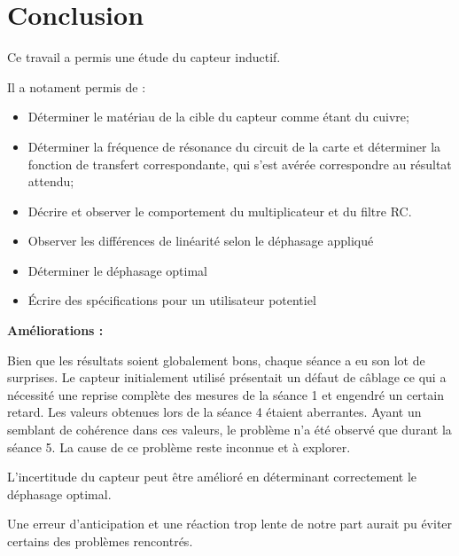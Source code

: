 \newpage
\section{Conclusion}

Ce travail a permis une étude du capteur inductif.

Il a notament permis de :

\begin{itemize}
    \item Déterminer le matériau de la cible du capteur comme étant du cuivre;
    \item Déterminer la fréquence de résonance du circuit de la carte et déterminer la fonction 
    de transfert correspondante, qui s'est avérée correspondre au résultat attendu; 
    \item Décrire et observer le comportement du multiplicateur et du filtre RC. 
    \item Observer les différences de linéarité selon le déphasage appliqué
    \item Déterminer le déphasage optimal
    \item Écrire des spécifications pour un utilisateur potentiel
\end{itemize}

\textbf{Améliorations :}

Bien que les résultats soient globalement bons, chaque séance a eu son lot de surprises.
Le capteur initialement utilisé présentait un défaut de câblage ce qui a nécessité une reprise 
complète des mesures de la séance 1 et engendré un certain retard. Les valeurs obtenues lors de la
séance 4 étaient aberrantes. Ayant un semblant de cohérence dans ces valeurs, le problème n'a été
observé que durant la séance 5. La cause de ce problème reste inconnue et à explorer. 
\vspace{0.2cm}

L'incertitude du capteur peut être amélioré en déterminant correctement le déphasage optimal.
\vspace{0.2cm}

\vspace{0.2cm}
Une erreur d'anticipation et une réaction trop lente de notre part aurait pu éviter certains des
problèmes rencontrés.
